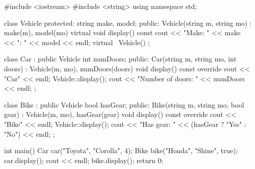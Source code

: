 \outputlabel
{}


\codelabel

\begin{code}
#include <iostream>
#include <string>
using namespace std;

class Vehicle {
protected:
    string make, model;
public:
    Vehicle(string m, string mo) : make(m), model(mo) {}
    virtual void display() const {
        cout << "Make: " << make << "\nModel: " << model << endl;
    }
    virtual ~Vehicle() {}
};

class Car : public Vehicle {
    int numDoors;
public:
    Car(string m, string mo, int doors) : Vehicle(m, mo), numDoors(doors) {}
    void display() const override {
        cout << "Car" << endl; Vehicle::display();
        cout << "Number of doors: " << numDoors << endl;
    }
};

class Bike : public Vehicle {
    bool hasGear;
public:
    Bike(string m, string mo, bool gear) : Vehicle(m, mo), hasGear(gear) {}
    void display() const override {
        cout << "Bike" << endl; Vehicle::display();
        cout << "Has gear: " << (hasGear ? "Yes" : "No") << endl;
    }
};

int main() {
    Car car("Toyota", "Corolla", 4);
    Bike bike("Honda", "Shine", true);
    car.display(); cout << endl; bike.display();
    return 0;
}
\end{code}

\outputlabel
{}


\codelabel

